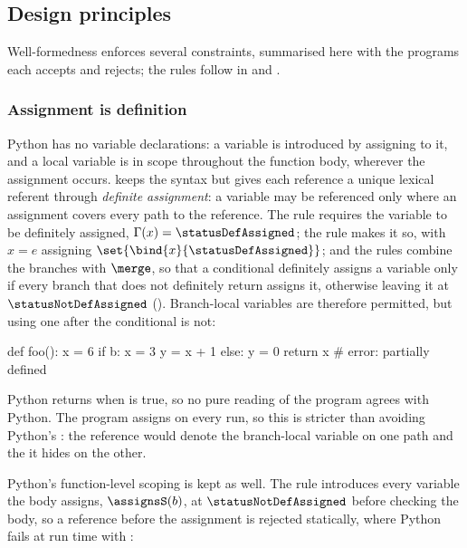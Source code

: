 \subsection{Design principles}
\label{sec:principles}

Well-formedness enforces several constraints, summarised here with the programs each accepts and rejects;
the rules follow in  and .

\subsubsection{Assignment is definition}
\label{sec:local-assignment}

Python has no variable declarations: a variable is introduced by assigning to it, and a local variable is
in scope throughout the function body, wherever the assignment occurs. \PurePy keeps the syntax but gives
each reference a unique lexical referent through \emph{definite assignment}: a variable may be referenced
only where an assignment covers every path to the reference. The  rule requires the variable
to be definitely assigned, $\Gamma(x) = \statusDefAssigned$; the  rule makes it so, with
$x = e$ assigning $\set{\bind{x}{\statusDefAssigned}}$; and the  rules combine the branches with
$\merge$, so that a conditional definitely assigns a variable only if every branch that does not definitely
return assigns it, otherwise leaving it at $\statusNotDefAssigned$ (). Branch-local
variables are therefore permitted, but using one after the conditional is not:

\begin{python}
def foo():
    x = 6
    if b:
        x = 3
        y = x + 1
    else:
        y = 0
    return x  # error: partially defined
\end{python}

\noindent Python returns  when  is true, so no pure reading of the program agrees
with Python. The program assigns  on every run, so this is stricter than avoiding Python's
: the reference would denote the branch-local variable on one path and the
 it hides on the other.

Python's function-level scoping is kept as well. The  rule introduces every variable the
body assigns, $\assignsS(b)$, at $\statusNotDefAssigned$ before checking the body, so a reference before the
assignment is rejected statically, where Python fails at run time with :

